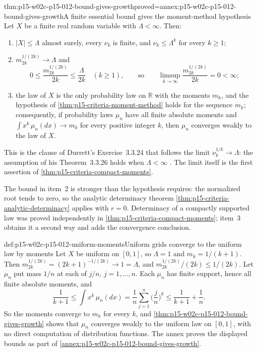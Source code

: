 \begin{hbcorollary}{thm:p15-w02c-p15-012-bound-gives-growth}{proved=annex:p15-w02c-p15-012-bound-gives-growth}{A finite essential bound gives the moment-method hypothesis}
Let \(X\) be a finite real random variable with \(\Lambda<\infty\).
Then:
\begin{enumerate}
\item \(|X|\leq\Lambda\) almost surely, every \(\nu_k\) is finite, and
      \(\nu_k\leq\Lambda^k\) for every \(k\geq1\);
\item \(m_{2k}^{1/(2k)}\to\Lambda\) and
      \[
       0\leq\frac{m_{2k}^{1/(2k)}}{2k}\leq\frac{\Lambda}{2k}
       \quad(k\geq1),\qquad\text{so}\qquad
       \limsup_{k\to\infty}\frac{m_{2k}^{1/(2k)}}{2k}=0<\infty;
      \]
\item the law of \(X\) is the only probability law on \(\mathbb R\) with
      the moments \(m_k\), and the hypothesis of
      \cref{thm:p15-criteria-moment-method} holds for the sequence
      \(m_k\); consequently, if probability laws \(\mu_n\) have all finite
      absolute moments and \(\int x^k\,\mu_n(dx)\to m_k\) for every positive
      integer \(k\), then \(\mu_n\) converges weakly to the law of \(X\).
\end{enumerate}
This is the clause of Durrett's Exercise~3.3.24 that follows the limit
\(\nu_k^{1/k}\to\Lambda\): the assumption of his Theorem~3.3.26 holds
when \(\Lambda<\infty\) \cite[p.~143]{DurrettPTEAuthor2019}. The limit
itself is the first assertion of \cref{thm:p15-criteria-compact-moments}.
\end{hbcorollary}

The bound in item~2 is stronger than the hypothesis requires: the
normalized root tends to zero, so the analytic determinacy theorem
\cref{thm:p15-criteria-analytic-determinacy} applies with \(r=0\).
Determinacy of a compactly supported
law was proved independently in \cref{thm:p15-criteria-compact-moments};
item~3 obtains it a second way and adds the convergence conclusion.

\begin{hbexample}{def:p15-w02c-p15-012-uniform-moments}{Uniform grids converge to the uniform law by moments}
Let \(X\) be uniform on \([0,1]\), so \(\Lambda=1\) and
\(m_k=1/(k+1)\). Then \(m_{2k}^{1/(2k)}=(2k+1)^{-1/(2k)}\to1=\Lambda\),
and \(m_{2k}^{1/(2k)}/(2k)\leq1/(2k)\).
Let \(\mu_n\) put mass \(1/n\) at each of \(j/n\), \(j=1,\ldots,n\).
Each \(\mu_n\) has finite support, hence all finite absolute moments, and
\[
 \frac1{k+1}\leq\int x^k\,\mu_n(dx)=\frac1n\sum_{j=1}^n\Big(\frac jn\Big)^k
 \leq\frac1{k+1}+\frac1n .
\]
So the moments converge to \(m_k\) for every \(k\), and
\cref{thm:p15-w02c-p15-012-bound-gives-growth} shows
that \(\mu_n\) converges weakly to the uniform law on \([0,1]\), with no direct computation of
distribution functions. The annex proves the displayed bounds as part of
\cref{annex:p15-w02c-p15-012-bound-gives-growth}.
\end{hbexample}

